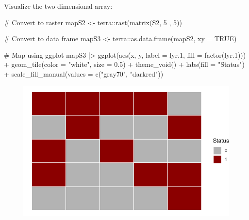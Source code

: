 \documentclass[
  letterpaper,
  DIV=11,
  numbers=noendperiod]{scrreprt}
\newenvironment{Shaded}{\begin{snugshade}}{\end{snugshade}}
\newcommand{\AttributeTok}[1]{\textcolor[rgb]{0.40,0.45,0.13}{#1}}
\newcommand{\CommentTok}[1]{\textcolor[rgb]{0.37,0.37,0.37}{#1}}
\newcommand{\ConstantTok}[1]{\textcolor[rgb]{0.56,0.35,0.01}{#1}}
\newcommand{\DecValTok}[1]{\textcolor[rgb]{0.68,0.00,0.00}{#1}}
\newcommand{\FloatTok}[1]{\textcolor[rgb]{0.68,0.00,0.00}{#1}}
\newcommand{\FunctionTok}[1]{\textcolor[rgb]{0.28,0.35,0.67}{#1}}
\newcommand{\NormalTok}[1]{\textcolor[rgb]{0.00,0.23,0.31}{#1}}
\newcommand{\OtherTok}[1]{\textcolor[rgb]{0.00,0.23,0.31}{#1}}
\newcommand{\SpecialCharTok}[1]{\textcolor[rgb]{0.37,0.37,0.37}{#1}}
\newcommand{\StringTok}[1]{\textcolor[rgb]{0.13,0.47,0.30}{#1}}
\begin{document}
Visualize the two-dimensional array:

\begin{Shaded}
\begin{Highlighting}[]
\CommentTok{\# Convert to raster }
\NormalTok{mapS2 }\OtherTok{\textless{}{-}}\NormalTok{ terra}\SpecialCharTok{::}\FunctionTok{rast}\NormalTok{(}\FunctionTok{matrix}\NormalTok{(S2, }\DecValTok{5}\NormalTok{ , }\DecValTok{5}\NormalTok{))}

\CommentTok{\# Convert to data frame}
\NormalTok{mapS3 }\OtherTok{\textless{}{-}}\NormalTok{ terra}\SpecialCharTok{::}\FunctionTok{as.data.frame}\NormalTok{(mapS2, }\AttributeTok{xy =} \ConstantTok{TRUE}\NormalTok{)}

\CommentTok{\# Map using ggplot}
\NormalTok{mapS3 }\SpecialCharTok{|\textgreater{}}
  \FunctionTok{ggplot}\NormalTok{(}\FunctionTok{aes}\NormalTok{(x, y, }\AttributeTok{label =}\NormalTok{ lyr}\FloatTok{.1}\NormalTok{, }\AttributeTok{fill =} \FunctionTok{factor}\NormalTok{(lyr}\FloatTok{.1}\NormalTok{))) }\SpecialCharTok{+}
  \FunctionTok{geom\_tile}\NormalTok{(}\AttributeTok{color =} \StringTok{"white"}\NormalTok{, }\AttributeTok{size =} \FloatTok{0.5}\NormalTok{) }\SpecialCharTok{+}
  \FunctionTok{theme\_void}\NormalTok{() }\SpecialCharTok{+}
  \FunctionTok{labs}\NormalTok{(}\AttributeTok{fill =} \StringTok{"Status"}\NormalTok{) }\SpecialCharTok{+}
  \FunctionTok{scale\_fill\_manual}\NormalTok{(}\AttributeTok{values =} \FunctionTok{c}\NormalTok{(}\StringTok{"gray70"}\NormalTok{, }\StringTok{"darkred"}\NormalTok{))}
\end{Highlighting}
\end{Shaded}

\begin{figure}[H]

{\centering \includegraphics{./spatial-tests_files/figure-pdf/unnamed-chunk-20-1.pdf}

}

\end{figure}
\end{document}
